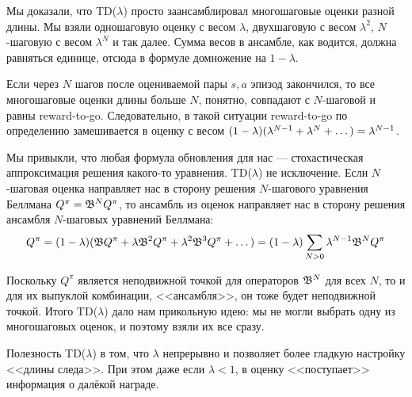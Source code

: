 Мы доказали, что TD($\lambda$) просто заансамблировал многошаговые оценки разной длины. Мы взяли одношаговую оценку с весом $\lambda$, двухшаговую с весом $\lambda^2$, $N$-шаговую с весом $\lambda^N$ и так далее. Сумма весов в ансамбле, как водится, должна равняться единице, отсюда в формуле домножение на $1 - \lambda$.

Если через $N$ шагов после оцениваемой пары $s, a$ эпизод закончился, то все многошаговые оценки длины больше $N$, понятно, совпадают с $N$-шаговой и равны reward-to-go. Следовательно, в такой ситуации reward-to-go по определению замешивается в оценку с весом $(1 - \lambda)(\lambda^{N-1} + \lambda^{N} + \dots) \HM= \lambda^{N-1}$.

Мы привыкли, что любая формула обновления для нас --- стохастическая аппроксимация решения какого-то уравнения. TD($\lambda$) не исключение. Если $N$-шаговая оценка направляет нас в сторону решения $N$-шагового уравнения Беллмана $Q^{\pi} \HM= \B^N Q^{\pi}$, то ансамбль из оценок направляет нас в сторону решения ансамбля $N$-шаговых уравнений Беллмана:
\begin{equation}\label{bellman_ensemble}
Q^{\pi} = (1 - \lambda)(\mathfrak{B} Q^{\pi} + \lambda \mathfrak{B}^2 Q^{\pi} + \lambda^2 \mathfrak{B}^3 Q^{\pi} + \dots ) = (1 - \lambda) \sum_{N > 0} \lambda^{N-1} \mathfrak{B}^N Q^{\pi}
\end{equation}

Поскольку $Q^{\pi}$ является неподвижной точкой для операторов $\mathfrak{B}^N$ для всех $N$, то и для их выпуклой комбинации, <<ансамбля>>, он тоже будет неподвижной точкой. Итого TD($\lambda$) дало нам прикольную идею: мы не могли выбрать одну из многошаговых оценок, и поэтому взяли их все сразу.

\begin{remark}
Полезность TD($\lambda$) в том, что $\lambda$ непрерывно и позволяет более гладкую настройку <<длины следа>>. При этом даже если $\lambda < 1$, в оценку <<поступает>> информация о далёкой награде.
\end{remark}